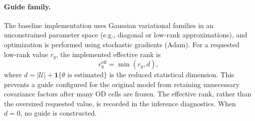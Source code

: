 \paragraph{Guide family.}
The baseline implementation uses Gaussian variational families in an unconstrained parameter space
(e.g., diagonal or low-rank approximations), and optimization is performed using stochastic gradients (Adam).
For a requested low-rank value $r_q$, the implemented effective rank is
\[
r_q^{\mathrm{eff}}=\min(r_q,d),
\]
where $d=|\mathcal U|+\mathbf{1}\{\theta\text{ is estimated}\}$ is the reduced
statistical dimension. This prevents a guide configured for the original model
from retaining unnecessary covariance factors after many OD cells are frozen.
The effective rank, rather than the oversized requested value, is recorded in
the inference diagnostics. When $d=0$, no guide is constructed.

